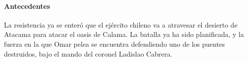 \paragraph{Antecedentes} La resistencia ya se enteró que el ejército chileno va a atravesar el desierto de Atacama para atacar el oasis de Calama. La batalla ya ha sido planificada, y la fuerza en la que Omar pelea se encuentra defendiendo uno de los puentes destruidos, bajo el mando del coronel Ladislao Cabrera.
